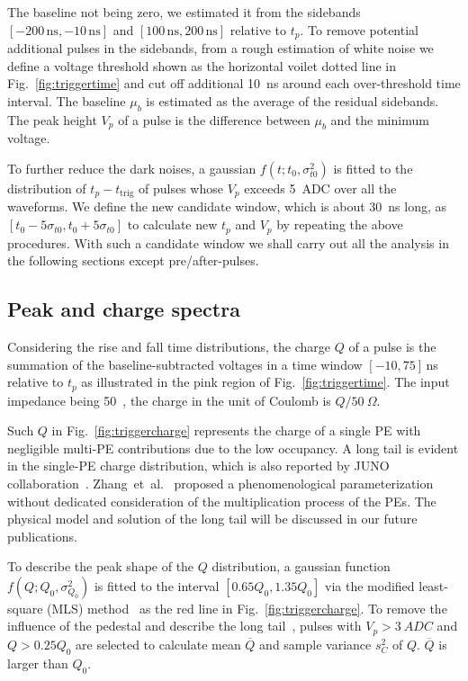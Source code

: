 The baseline not being zero, we estimated it from the sidebands $[-200\,\mathrm{ns},-10\,\mathrm{ns}]$ and $[100\,\mathrm{ns},200\,\mathrm{ns}]$ relative to $t_p$. To remove potential additional pulses in the sidebands, from a rough estimation of white noise we define a voltage threshold shown as the horizontal voilet dotted line in Fig.~\ref{fig:triggertime} and cut off additional \SI{10}{ns} around each over-threshold time interval. The baseline $\mu_b$ is estimated as the average of the residual sidebands. The peak height $V_p$ of a pulse is the difference between $\mu_b$ and the minimum voltage.

To further reduce the dark noises, a gaussian $f(t;t_0,\sigma_{t0}^2)$ is fitted to the distribution of $t_p-t_{\mathrm{trig}}$ of pulses whose $V_p$ exceeds \SI{5}{ADC} over all the waveforms. We define the new candidate window, which is about \SI{30}{ns} long, as $[t_0-5\sigma_{t0}, t_0+5\sigma_{t0}]$ to calculate new $t_p$ and $V_p$ by repeating the above procedures. With such a candidate window we shall carry out all the analysis in the following sections except pre/after-pulses.

\subsection{Peak and charge spectra}
\label{sec:noisepeak}

Considering the rise and fall time distributions, the charge $Q$ of a pulse is the summation of the baseline-subtracted voltages in a time window $[-10, 75]$\,ns relative to $t_p$ as illustrated in the pink region of Fig.~\ref{fig:triggertime}. The input impedance being \SI{50}{\Omega}~\cite{CAENV1751}, the charge in the unit of Coulomb is $Q/\SI{50}{\Omega}$.

Such $Q$ in Fig.~\ref{fig:triggercharge} represents the charge of a single PE with negligible multi-PE contributions due to the low occupancy. A long tail is evident in the single-PE charge distribution, which is also reported by JUNO collaboration~\cite{JUNOMassTesting}. Zhang~et~al.~\cite{JUNOLongtail} proposed a phenomenological parameterization without dedicated consideration of the multiplication process of the PEs. The physical model and solution of the long tail will be discussed in our future publications.

To describe the peak shape of the $Q$ distribution, a gaussian function $f(Q;Q_0,\sigma^2_{Q_0})$ is fitted to the interval $[0.65Q_0, 1.35Q_0]$ via the modified least-square (MLS) method~\cite{Cowan1998StatisticalDA} as the red line in Fig.~\ref{fig:triggercharge}. To remove the influence of the pedestal and describe the long tail~\cite{JUNOLongtail}, pulses with $V_p>\SI{3}{ADC}$ and $Q>0.25Q_0$ are selected to calculate mean $\overline{Q}$ and sample variance $s^2_{C}$ of $Q$. $\overline{Q}$ is larger than $Q_0$.

